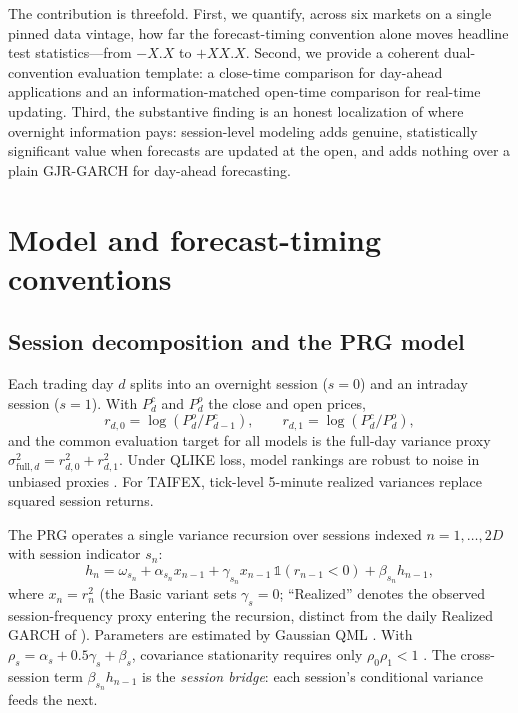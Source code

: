 \documentclass[11pt,a4paper]{article}
\begin{document}
The contribution is threefold. First, we quantify, across six markets on a single pinned data vintage, how far the forecast-timing convention alone moves headline test statistics---from
$-X.X$ to $+XX.X$.
Second, we provide a coherent dual-convention evaluation template: a close-time comparison for day-ahead applications and an information-matched open-time comparison for real-time updating. Third, the substantive finding is an honest localization of where overnight information pays: session-level modeling adds genuine, statistically significant value when forecasts are updated at the open, and adds nothing over a plain GJR-GARCH for day-ahead forecasting.

\section{Model and forecast-timing conventions}

\subsection{Session decomposition and the PRG model}

Each trading day $d$ splits into an overnight session ($s=0$) and an intraday session ($s=1$). With $P^{c}_d$ and $P^{o}_d$ the close and open prices,
\begin{equation}
    r_{d,0} = \log(P^{o}_d / P^{c}_{d-1}), \qquad
    r_{d,1} = \log(P^{c}_d / P^{o}_d),
    \label{eq:sessions}
\end{equation}
and the common evaluation target for all models is the full-day variance proxy $\sigma^2_{\text{full},d} = r^2_{d,0} + r^2_{d,1}$. Under QLIKE loss, model rankings are robust to noise in unbiased proxies \citep{Patton2011,Hansen2006}. For TAIFEX, tick-level 5-minute realized variances replace squared session returns.

The PRG operates a single variance recursion over sessions indexed $n = 1, \ldots, 2D$ with session indicator $s_n$:
\begin{equation}
    h_n = \omega_{s_n} + \alpha_{s_n} x_{n-1} + \gamma_{s_n} x_{n-1}\,\mathbb{1}(r_{n-1}<0) + \beta_{s_n} h_{n-1},
    \label{eq:prg}
\end{equation}
where $x_n = r^2_n$ (the Basic variant sets $\gamma_s = 0$; ``Realized'' denotes the observed session-frequency proxy entering the recursion, distinct from the daily Realized GARCH of \citealp{Hansen2012}). Parameters are estimated by Gaussian QML \citep{BollerslevWooldridge1992}. With $\rho_s = \alpha_s + 0.5\gamma_s + \beta_s$, covariance stationarity requires only $\rho_0\rho_1 < 1$ \citep{Bollerslev1996}. The cross-session term $\beta_{s_n} h_{n-1}$ is the \emph{session bridge}: each session's conditional variance feeds the next.
\end{document}
